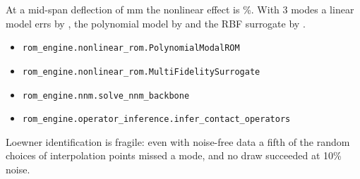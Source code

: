 \newpage\thispagestyle{hl}
\par
{}
\begin{hlheadline}At a mid-span deflection of \cnlDefl{} mm the nonlinear effect is \cnlNlEffectPct\%. With 3 modes a linear model errs by \cnlLinThree, the polynomial model by \cnlIceThree{} and the RBF surrogate by \cnlMfsThree.\end{hlheadline}
{\begin{itemize}\setlength\itemsep{2pt}
\item \texttt{rom\_engine.nonlinear\_rom.PolynomialModalROM}
\item \texttt{rom\_engine.nonlinear\_rom.MultiFidelitySurrogate}
\item \texttt{rom\_engine.nnm.solve\_nnm\_backbone}
\item \texttt{rom\_engine.operator\_inference.infer\_contact\_operators}
\end{itemize}}
\begin{hllimit}Loewner identification is fragile: even with noise-free data a fifth of the random choices of interpolation points missed a mode, and no draw succeeded at 10\% noise.\end{hllimit}
